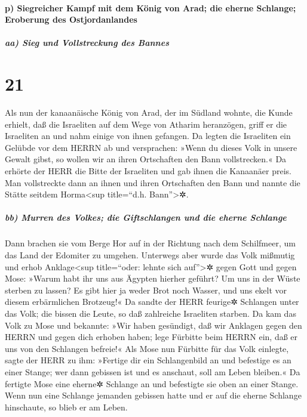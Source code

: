 \hypertarget{p-siegreicher-kampf-mit-dem-kuxf6nig-von-arad-die-eherne-schlange-eroberung-des-ostjordanlandes}{%
\paragraph{p) Siegreicher Kampf mit dem König von Arad; die eherne
Schlange; Eroberung des
Ostjordanlandes}\label{p-siegreicher-kampf-mit-dem-kuxf6nig-von-arad-die-eherne-schlange-eroberung-des-ostjordanlandes}}

\hypertarget{aa-sieg-und-vollstreckung-des-bannes}{%
\subparagraph{aa) Sieg und Vollstreckung des
Bannes}\label{aa-sieg-und-vollstreckung-des-bannes}}

\hypertarget{section-20}{%
\section{21}\label{section-20}}

Als nun der kanaanäische König von Arad, der im Südland
wohnte, die Kunde erhielt, daß die Israeliten auf dem Wege von Atharim
heranzögen, griff er die Israeliten an und nahm einige von ihnen
gefangen. Da legten die Israeliten ein Gelübde vor dem
HERRN ab und versprachen: »Wenn du dieses Volk in unsere Gewalt gibst,
so wollen wir an ihren Ortschaften den Bann vollstrecken.«
Da erhörte der HERR die Bitte der Israeliten und gab ihnen
die Kanaanäer preis. Man vollstreckte dann an ihnen und ihren
Ortschaften den Bann und nannte die Stätte seitdem Horma\textless sup
title=``d.h. Bann''\textgreater✲.

\hypertarget{bb-murren-des-volkes-die-giftschlangen-und-die-eherne-schlange}{%
\subparagraph{bb) Murren des Volkes; die Giftschlangen und die eherne
Schlange}\label{bb-murren-des-volkes-die-giftschlangen-und-die-eherne-schlange}}

Dann brachen sie vom Berge Hor auf in der Richtung nach
dem Schilfmeer, um das Land der Edomiter zu umgehen. Unterwegs aber
wurde das Volk mißmutig und erhob Anklage\textless sup
title=``oder: lehnte sich auf''\textgreater✲ gegen Gott und gegen Mose:
»Warum habt ihr uns aus Ägypten hierher geführt? Um uns in der Wüste
sterben zu lassen? Es gibt hier ja weder Brot noch Wasser, und uns ekelt
vor diesem erbärmlichen Brotzeug!« Da sandte der HERR
feurige✲ Schlangen unter das Volk; die bissen die Leute, so daß
zahlreiche Israeliten starben. Da kam das Volk zu Mose und
bekannte: »Wir haben gesündigt, daß wir Anklagen gegen den HERRN und
gegen dich erhoben haben; lege Fürbitte beim HERRN ein, daß er uns von
den Schlangen befreie!« Als Mose nun Fürbitte für das Volk einlegte,
sagte der HERR zu ihm: »Fertige dir ein Schlangenbild an
und befestige es an einer Stange; wer dann gebissen ist und es anschaut,
soll am Leben bleiben.« Da fertigte Mose eine eherne✲
Schlange an und befestigte sie oben an einer Stange. Wenn nun eine
Schlange jemanden gebissen hatte und er auf die eherne Schlange
hinschaute, so blieb er am Leben.

